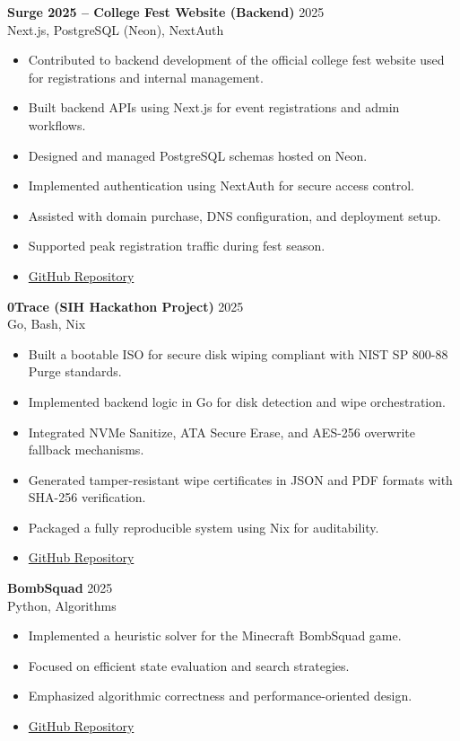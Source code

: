 \documentclass[a4paper,10pt]{article}
\begin{document}
\textbf{Surge 2025 – College Fest Website (Backend)} \hfill 2025 \\
Next.js, PostgreSQL (Neon), NextAuth

\begin{itemize}[noitemsep, topsep=2pt]
    \item Contributed to backend development of the official college fest website used for registrations and internal management.
    \item Built backend APIs using Next.js for event registrations and admin workflows.
    \item Designed and managed PostgreSQL schemas hosted on Neon.
    \item Implemented authentication using NextAuth for secure access control.
    \item Assisted with domain purchase, DNS configuration, and deployment setup.
    \item Supported peak registration traffic during fest season.
    \item \href{https://github.com/eklavya172004/Surge-website-2025}{GitHub Repository}
\end{itemize}

\par\noindent
\textbf{0Trace (SIH Hackathon Project)} \hfill 2025 \\
Go, Bash, Nix

\begin{itemize}[noitemsep, topsep=2pt]
    \item Built a bootable ISO for secure disk wiping compliant with NIST SP 800-88 Purge standards.
    \item Implemented backend logic in Go for disk detection and wipe orchestration.
    \item Integrated NVMe Sanitize, ATA Secure Erase, and AES-256 overwrite fallback mechanisms.
    \item Generated tamper-resistant wipe certificates in JSON and PDF formats with SHA-256 verification.
    \item Packaged a fully reproducible system using Nix for auditability.
    \item \href{https://github.com/spuckhafte/0trace}{GitHub Repository}
\end{itemize}

\par\noindent
\textbf{BombSquad} \hfill 2025 \\
Python, Algorithms

\begin{itemize}[noitemsep, topsep=2pt]
    \item Implemented a heuristic solver for the Minecraft BombSquad game.
    \item Focused on efficient state evaluation and search strategies.
    \item Emphasized algorithmic correctness and performance-oriented design.
    \item \href{https://github.com/haibaaa/bombsquad}{GitHub Repository}
\end{itemize}
\end{document}
